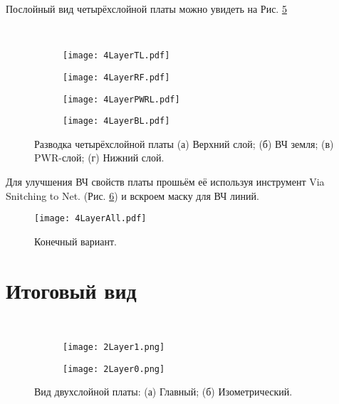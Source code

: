 Послойный вид четырёхслойной платы можно увидеть на Рис. \ref{fig:4LayerPCB}

\begin{figure}[H]
	\centering\
	\begin{subfigure}[b]{0.45\textwidth}
		\centering
		\texttt{[image: 4LayerTL.pdf]}
		\caption{}%
		\label{fig:4LayerTL}
	\end{subfigure}
	\hfill
	\begin{subfigure}[b]{0.45\textwidth}
		\centering
		\texttt{[image: 4LayerRF.pdf]}
		\caption{}%
		\label{fig:4LayerRF}
	\end{subfigure}
	\hfill
	\begin{subfigure}[b]{0.45\textwidth}
		\centering
		\texttt{[image: 4LayerPWRL.pdf]}
		\caption{}%
		\label{fig:4LayerPWRL}
	\end{subfigure}
	\hfill
	\begin{subfigure}[b]{0.45\textwidth}
		\centering
		\texttt{[image: 4LayerBL.pdf]}
		\caption{}%
		\label{fig:4LayerBL}
\end{subfigure}
	\caption{%
		Разводка четырёхслойной платы
		(а) Верхний слой;
		(б) ВЧ земля;
		(в) PWR-слой;
		(г) Нижний слой.
	}%
	\label{fig:4LayerPCB}
\end{figure}
Для улучшения ВЧ свойств платы прошьём её используя инструмент Via Snitching to Net. (Рис. \ref{fig:4LayerAll}) и вскроем маску для ВЧ линий.
\begin{figure}[H]
	\centering
	\texttt{[image: 4LayerAll.pdf]}
	\caption{Конечный вариант.}%
	\label{fig:4LayerAll}
\end{figure}

\section{Итоговый вид}

\begin{figure}[H]
	\centering\
	\begin{subfigure}[b]{0.45\textwidth}
		\centering
		\texttt{[image: 2Layer1.png]}
		\caption{}%
		\label{fig:2Layer1}
	\end{subfigure}
	\hfill
	\begin{subfigure}[b]{0.45\textwidth}
		\centering
		\texttt{[image: 2Layer0.png]}
		\caption{}%
		\label{fig:2Layer0}
	\end{subfigure}
	\caption{%
		Вид двухслойной платы:
		(а) Главный;
		(б) Изометрический.
	}%
	\label{fig:2Layer3D}
\end{figure}

